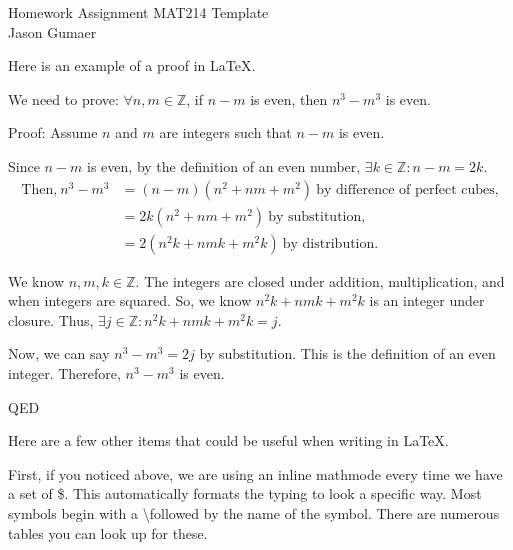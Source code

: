 \documentclass[12pt]{article}
\begin{document}

\begin{center}
    Homework Assignment MAT214 Template \\
    Jason Gumaer
\end{center}

\begin{center}
    \Large Here is an example of a proof in \LaTeX. \normalsize
\end{center}

We need to prove: $\forall n,m \in \mathbb{Z}$, if $n-m$ is even, then $n^3 - m^3$ is even.
    
    
Proof: Assume $n$ and $m$ are integers such that $n-m$ is even.
    
Since $n-m$ is even, by the definition of an even number, $\exists k \in \mathbb{Z}: n-m = 2k$.
    \begin{align*}
        \textrm{Then,} \ n^3 - m^3 &= (n-m)(n^2 + nm + m^2) \ \textrm{by difference of perfect cubes,} \\
        &= 2k(n^2 + nm + m^2) \ \textrm{by substitution,} \\
        &= 2(n^2k + nmk + m^2k) \ \textrm{by distribution.}
    \end{align*}
    
We know $n, m, k \in \mathbb{Z}$.  The integers are closed under addition, multiplication, and when integers are squared.  So, we know $n^2k + nmk + m^2k$ is an integer under closure.  Thus, $\exists j \in \mathbb{Z}: n^2k + nmk + m^2k = j$.
    
Now, we can say $n^3-m^3 = 2j$ by substitution. This is the definition of an even integer.  Therefore, $n^3-m^3$ is even.

\noindent QED
   
\begin{center}
    \Large Here are a few other items that could be useful when writing in \LaTeX. \normalsize
\end{center}  

First, if you noticed above, we are using an inline mathmode every time we have a set of \$.  This automatically formats the typing to look a specific way.  Most symbols begin with a \textbackslash followed by the name of the symbol.  There are numerous tables you can look up for these.
\end{document}
